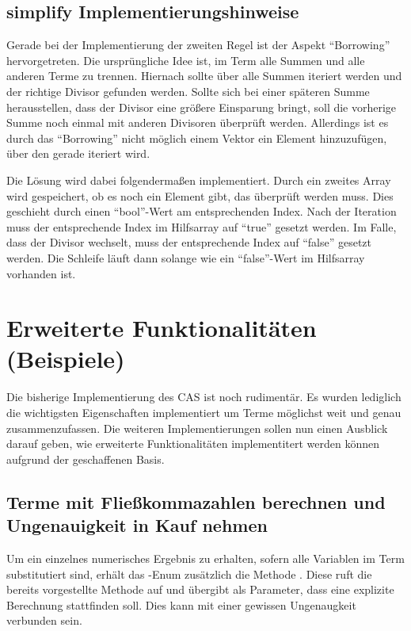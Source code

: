 \documentclass[11pt,a4paper, ngerman]{article}
\begin{document}
\subsection{simplify Implementierungshinweise}
Gerade bei der Implementierung der zweiten Regel ist der Aspekt ``Borrowing'' hervorgetreten. Die ursprüngliche Idee ist, im Term alle Summen und alle anderen Terme zu trennen. Hiernach sollte über alle Summen iteriert werden und der richtige Divisor gefunden werden. Sollte sich bei einer späteren Summe herausstellen, dass der Divisor eine größere Einsparung bringt, soll die vorherige Summe noch einmal mit anderen Divisoren überprüft werden. Allerdings ist es durch das ``Borrowing'' nicht möglich einem Vektor ein Element hinzuzufügen, über den gerade iteriert wird.

Die Lösung wird dabei folgendermaßen implementiert. Durch ein zweites Array wird gespeichert, ob es noch ein Element gibt, das überprüft werden muss. Dies geschieht durch einen ``bool''-Wert am entsprechenden Index. Nach der Iteration muss der entsprechende Index im Hilfsarray auf ``true'' gesetzt werden. Im Falle, dass der Divisor wechselt, muss der entsprechende Index auf ``false'' gesetzt werden. Die Schleife läuft dann solange wie ein ``false''-Wert im Hilfsarray vorhanden ist.

\newpage

\section{Erweiterte Funktionalitäten (Beispiele)}
Die bisherige Implementierung des CAS ist noch rudimentär. Es wurden lediglich die wichtigsten Eigenschaften implementiert um Terme möglichst weit und genau zusammenzufassen.
Die weiteren Implementierungen sollen nun einen Ausblick darauf geben, wie erweiterte Funktionalitäten implementitert werden können aufgrund der geschaffenen Basis. 

\label{sec:ungenauigkeitenKapitel}
\subsection{Terme mit Fließkommazahlen berechnen und Ungenauigkeit in Kauf nehmen} Um ein einzelnes numerisches Ergebnis zu erhalten, sofern alle Variablen im Term substitutiert sind, erhält das -Enum zusätzlich die Methode . Diese ruft die bereits vorgestellte Methode  auf und übergibt als Parameter, dass eine explizite Berechnung stattfinden soll. Dies kann mit einer gewissen Ungenaugkeit verbunden sein.
\end{document}
